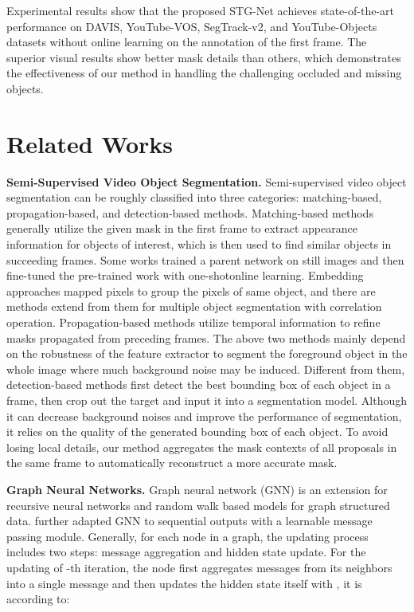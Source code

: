 \documentclass[letterpaper]{article} \usepackage{aaai21}  \usepackage{times}  \usepackage{helvet} \usepackage{courier}  \usepackage[hyphens]{url}  \usepackage{graphicx} \urlstyle{rm} \def\UrlFont{\rm}  \usepackage{graphicx}  \usepackage{natbib}  \usepackage{caption} \frenchspacing  \setlength{\pdfpagewidth}{8.5in}  \setlength{\pdfpageheight}{11in}  \usepackage{amsmath}
\begin{document}
Experimental results show that the proposed STG-Net achieves state-of-the-art performance on DAVIS, YouTube-VOS, SegTrack-v2, and YouTube-Objects datasets without online learning on the annotation of the first frame. The superior visual results show better mask details than others, which demonstrates the effectiveness of our method in handling the challenging occluded and missing objects.

\section{Related Works}
\noindent \textbf{Semi-Supervised Video Object Segmentation.}
Semi-supervised video object segmentation can be roughly classified into three categories: matching-based, propagation-based, and detection-based methods. Matching-based methods \cite{caelles2017one,voigtlaender2017online,zeng2019dmm} generally utilize the given mask in the first frame to extract appearance information for objects of interest, which is then used to find similar objects in succeeding frames. 
Some works \cite{caelles2017one,voigtlaender2017online} trained a parent network on still images and then fine-tuned the pre-trained work with one-shotonline learning. 
Embedding approaches \cite{chen2018blazingly,hu2018videomatch} mapped pixels to group the pixels of same object, and there are methods \cite{voigtlaender2019feelvos,wang2019ranet} extend from them for multiple object segmentation with correlation operation.
Propagation-based methods \cite{wug2018fast,johnander2019generative,xu2019mhp} utilize temporal information to refine masks propagated from preceding frames.
The above two methods mainly depend on the robustness of the feature extractor to segment the foreground object in the whole image where much background noise may be induced. Different from them, detection-based methods \cite{li2017video,wang2019fast,luiten2018premvos} first detect the best bounding box of each object in a frame, then crop out the target and input it into a segmentation model. Although it can decrease background noises and improve the performance of segmentation, it relies on the quality of the generated bounding box of each object. To avoid losing local details, our method aggregates the mask contexts of all proposals in the same frame to automatically reconstruct a more accurate mask.

\noindent \textbf{Graph Neural Networks.}
Graph neural network (GNN) \cite{scarselli2008graph} is an extension for recursive neural networks and random walk based models for graph structured data. \cite{gilmer2017neural,li2018deeper} further adapted GNN to sequential outputs with a learnable message passing module.
Generally, for each node  in a graph, the updating process includes two steps: message aggregation and hidden state update. For the updating of -th iteration, the node  first aggregates messages from its neighbors  into a single message  and then updates the hidden state  itself with , it is according to:
\end{document}
